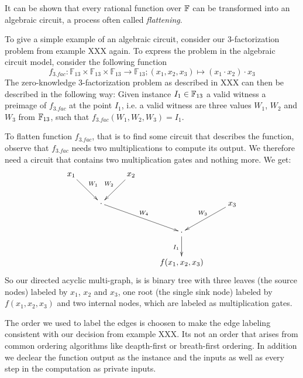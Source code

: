 It can be shown that every rational function over $\mathbb{F}$ can be transformed into an algebraic circuit, a process often called \textit{flattening}.
\begin{example} To give a simple example of an algebraic circuit, consider our $3$-factorization problem from example XXX again.  To express the problem in the algebraic circuit model, consider the following function 
\[
f_{3.fac}:\mathbb{F}_{13}\times\mathbb{F}_{13}\times\mathbb{F}_{13}\to\mathbb{F}_{13};(x_{1},x_{2},x_{3})\mapsto(x_{1}\cdot x_{2})\cdot x_{3}
\]
The zero-knowledge $3$-factorization problem as described in XXX can then be described in the following way: Given instance $I_1\in \mathbb{F}_{13}$ a valid witness a preimage of $f_{3.fac}$ at the point $I_1$, i.e. a valid witness are three values $W_1$, $W_2$ and $W_3$ from $\mathbb{F}_{13}$, such that $f_{3.fac}(W_1,W_2,W_3)=I_1$. 

To flatten function $f_{3.fac}$, that is to find some circuit that describes the function, observe that $f_{3.fac}$ needs two multiplications to compute its output. We therefore need a circuit that contains two multiplication gates and nothing more. We get:
\[
\xymatrix{x_1\ar^{W_1}[dr] &  & x_2\ar_{W_2}[dl]\\
 & \cdot \ar^{W_4}[drr] &   & & x_3\ar_{W_3}[dl]\\
  &  &  & \cdot\ar_{I_1}[d]\\
  &  &  & f(x_1,x_2,x_3)
}
\]
So our directed acyclic multi-graph, is is binary tree with three leaves (the source nodes) labeled by $x_1$, $x_2$ and $x_3$, one root (the single sink node) labeled by $f(x_1,x_2,x_3)$ and two internal nodes, which are labeled as multiplication gates. 

The order we used to label the edges is choosen to make the edge labeling consistent with our decision from example XXX. Its not an order that arises from common ordering algorithms like deapth-first or breath-first ordering. In addition we declear the function output as the instance and the inputs as well as every step in the computation as private inputs.
\end{example}
